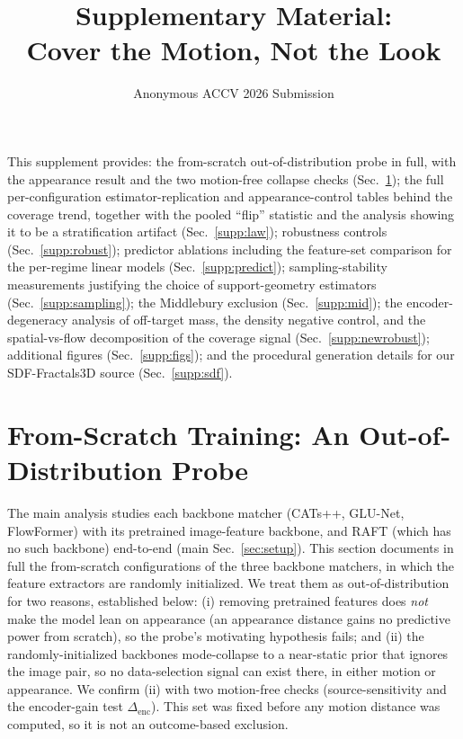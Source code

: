 \documentclass[runningheads]{llncs}
\begin{document}
\title{Supplementary Material:\\Cover the Motion, Not the Look}
\author{Anonymous ACCV 2026 Submission}
\maketitle

\noindent This supplement provides: the from-scratch out-of-distribution probe in
full, with the appearance result and the two motion-free collapse checks
(Sec.~\ref{supp:designcut}); the full per-configuration
estimator-replication and appearance-control tables behind the coverage trend,
together with the pooled ``flip'' statistic and the analysis showing it to be a
stratification artifact (Sec.~\ref{supp:law}); robustness controls
(Sec.~\ref{supp:robust}); predictor ablations including the feature-set
comparison for the per-regime linear models (Sec.~\ref{supp:predict});
sampling-stability measurements justifying the choice of support-geometry
estimators (Sec.~\ref{supp:sampling}); the Middlebury exclusion
(Sec.~\ref{supp:mid}); the encoder-degeneracy analysis of off-target mass, the density
negative control, and the spatial-vs-flow decomposition of the coverage signal
(Sec.~\ref{supp:newrobust}); additional figures (Sec.~\ref{supp:figs}); and the
procedural generation details for our SDF-Fractals3D source (Sec.~\ref{supp:sdf}).

\section{From-Scratch Training: An Out-of-Distribution Probe}
\label{supp:designcut}

The main analysis studies each backbone matcher (CATs++, GLU-Net, FlowFormer)
with its pretrained image-feature backbone, and RAFT (which has no such
backbone) end-to-end (main Sec.~\ref{sec:setup}). This section documents in full the from-scratch
configurations of the three backbone matchers, in which the feature extractors are
randomly initialized. We treat them as out-of-distribution for two
reasons, established below: (i) removing pretrained features does \emph{not} make
the model lean on appearance (an appearance distance gains no predictive power
from scratch), so the probe's motivating hypothesis fails; and (ii) the
randomly-initialized backbones mode-collapse to a near-static prior that ignores
the image pair, so no data-selection signal can exist there, in either motion or
appearance. We confirm (ii) with two motion-free checks (source-sensitivity and
the encoder-gain test $\Delta_{\text{enc}}$). This set was fixed before any motion
distance was computed, so it is not an outcome-based exclusion.
\end{document}
